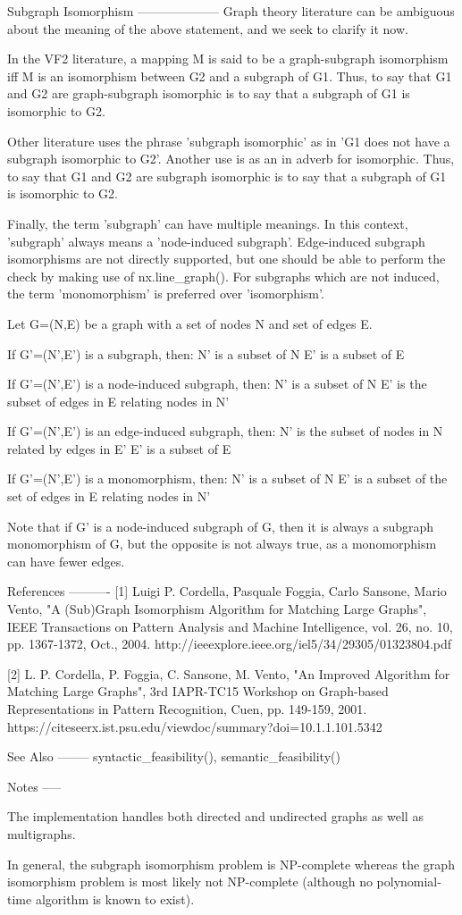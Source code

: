 \begin{DoxyVerb}
Subgraph Isomorphism
--------------------
Graph theory literature can be ambiguous about the meaning of the
above statement, and we seek to clarify it now.

In the VF2 literature, a mapping M is said to be a graph-subgraph
isomorphism iff M is an isomorphism between G2 and a subgraph of G1.
Thus, to say that G1 and G2 are graph-subgraph isomorphic is to say
that a subgraph of G1 is isomorphic to G2.

Other literature uses the phrase 'subgraph isomorphic' as in 'G1 does
not have a subgraph isomorphic to G2'.  Another use is as an in adverb
for isomorphic.  Thus, to say that G1 and G2 are subgraph isomorphic
is to say that a subgraph of G1 is isomorphic to G2.

Finally, the term 'subgraph' can have multiple meanings. In this
context, 'subgraph' always means a 'node-induced subgraph'. Edge-induced
subgraph isomorphisms are not directly supported, but one should be
able to perform the check by making use of nx.line_graph(). For
subgraphs which are not induced, the term 'monomorphism' is preferred
over 'isomorphism'.

Let G=(N,E) be a graph with a set of nodes N and set of edges E.

If G'=(N',E') is a subgraph, then:
N' is a subset of N
E' is a subset of E

If G'=(N',E') is a node-induced subgraph, then:
N' is a subset of N
E' is the subset of edges in E relating nodes in N'

If G'=(N',E') is an edge-induced subgraph, then:
N' is the subset of nodes in N related by edges in E'
E' is a subset of E

If G'=(N',E') is a monomorphism, then:
N' is a subset of N
E' is a subset of the set of edges in E relating nodes in N'

Note that if G' is a node-induced subgraph of G, then it is always a
subgraph monomorphism of G, but the opposite is not always true, as a
monomorphism can have fewer edges.

References
----------
[1]   Luigi P. Cordella, Pasquale Foggia, Carlo Sansone, Mario Vento,
  "A (Sub)Graph Isomorphism Algorithm for Matching Large Graphs",
  IEEE Transactions on Pattern Analysis and Machine Intelligence,
  vol. 26,  no. 10,  pp. 1367-1372,  Oct.,  2004.
  http://ieeexplore.ieee.org/iel5/34/29305/01323804.pdf

[2]   L. P. Cordella, P. Foggia, C. Sansone, M. Vento, "An Improved
  Algorithm for Matching Large Graphs", 3rd IAPR-TC15 Workshop
  on Graph-based Representations in Pattern Recognition, Cuen,
  pp. 149-159, 2001.
  https://citeseerx.ist.psu.edu/viewdoc/summary?doi=10.1.1.101.5342

See Also
--------
syntactic_feasibility(), semantic_feasibility()

Notes
-----

The implementation handles both directed and undirected graphs as well
as multigraphs.

In general, the subgraph isomorphism problem is NP-complete whereas the
graph isomorphism problem is most likely not NP-complete (although no
polynomial-time algorithm is known to exist).\end{DoxyVerb}
 